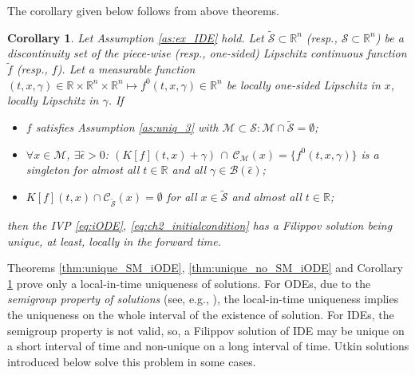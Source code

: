 \documentclass{article}
\newcommand{\R}{\mathbb{R}}
\newtheorem{corollary}{Corollary}
\begin{document}
The corollary given below follows from above theorems.
\begin{corollary}\label{cor:unique_mix_iODE}\itshape
		Let Assumption \ref{as:ex_IDE} hold. Let    $\tilde {\mathcal{S}}\subset \R^n$ (resp., $\mathcal{S}\subset \R^n$) be a discontinuity set of the piece-wise 	 (resp., one-sided) Lipschitz continuous  function $\tilde f$ (resp., $f$). Let a measurable function $(t,x,\gamma)\in \R\times \R^n\times \R^n \mapsto f^0(t,x,\gamma)\in \R^n$ be
	locally one-sided Lipschitz in $x$, locally Lipschitz in $\gamma$.
	If \vspace{0mm}
		\begin{itemize} 
		\item[1)]	$f$  satisfies
		 Assumption \ref{as:uniq_3} with
		$\mathcal{M}\subset \mathcal{S} : \mathcal{M}\cap \tilde {\mathcal{S}}=\emptyset$;
		\item[2)]  $\forall x\!\in\! \mathcal{M}$, \!$\exists \hat \epsilon\!>\!0$:\!  $\left(K[f](t,x)\!+\!\gamma\right)\,\!\cap\,\mathcal{C}_{\mathcal{M}}(x)\!=\!\{f^0(t,x,\gamma)\}$ is a singleton for almost all $t\in \R$ and 
		all $\gamma\in \mathcal{B}(\hat \epsilon)$;
		\item[3)]  $K[f](t,x)\cap \mathcal{C}_{\tilde{\mathcal{S}}}(x)\!=\!\emptyset$ for all $x\!\in\! \tilde{\mathcal{S}}$ and almost all $t\!\in\! \R$;\vspace{0mm}
	\end{itemize}
then
	the IVP  \eqref{eq:iODE}, \eqref{eq:ch2_initialcondition} has a Filippov solution being unique,  at least, locally in the forward time. 	
\end{corollary}

{
		Theorems \ref{thm:unique_SM_iODE},  \ref{thm:unique_no_SM_iODE} and Corollary \ref{cor:unique_mix_iODE}  prove only a local-in-time uniqueness of solutions. 
		For ODEs, due to the \textit{semigroup property of solutions} (see, e.g., \cite{CoddingtonLevinson1955:Book}), the local-in-time uniqueness implies  the uniqueness on the whole interval of the existence of solution. For IDEs, the semigroup property is not valid, so, a Filippov solution of IDE may be unique on a short interval of  time and non-unique on a long interval of time.   Utkin solutions introduced below solve this problem in some cases. 	
}
\end{document}
